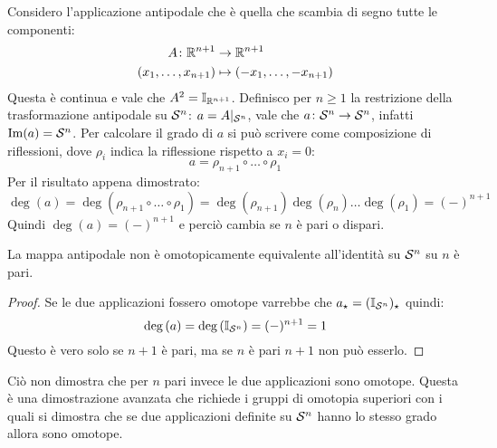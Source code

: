 Considero l'applicazione antipodale che è quella che scambia di segno tutte le componenti:
\begin{align*}
  A \colon \mathbb{R}^{{n+1}} & \to \mathbb{R}^{n+1} \\
  (x_1, \dots, x_{n+1}) & \mapsto (-x_1, \dots, -x_{n+1})
\end{align*}
Questa è continua e vale che $ A^2 = \mathbb{I}_{\mathbb{R}^{n+1}}$. Definisco per $ n \geq 1 $ la
restrizione della trasformazione antipodale su $ \mathcal{S}^{n} $:
$ a = A \lvert_{\mathcal{S}^{n}} $, vale che $ a \colon \mathcal{S}^{n} \to \mathcal{S}^{n} $, infatti
$ \mathrm{Im}( a ) = \mathcal{S}^{n} $. Per calcolare il grado di $ a $ si può scrivere come
composizione di riflessioni, dove $ \rho_i $ indica la riflessione rispetto a
$ x_i = 0 $:
\[
  a = \rho_{n+1} \circ \dots \circ \rho_1
\]
Per il risultato appena dimostrato:
\[
  \deg{(a)} = \deg{(\rho_{n+1} \circ \dots \circ \rho_1)} = \deg{(\rho_{n+1})}\deg{(\rho_n)}\dots\deg{(\rho_1)} = (-)^{n+1}
\]
Quindi $ \deg{(a)} = (-)^{n+1} $ e perciò cambia se $ n $ è pari o dispari.

\begin{corollary}
  La mappa antipodale non è omotopicamente equivalente all'identità su $ \mathcal{S}^{n} $ su $ n $ è pari.
\end{corollary}
\begin{proof}
  Se le due applicazioni fossero omotope varrebbe che $ a_\star = (\mathbb{I}_{\mathcal{S}^{n}})_\star $ quindi:
  \[
    \deg{(a)} = \deg{(\mathbb{I}_{\mathcal{S}^{n}})} = (-)^{n+1} = 1
  \]
  Questo è vero solo se $ n + 1 $ è pari, ma se $ n $ è pari $ n + 1 $ non può esserlo.
\end{proof}
\eproof
Ciò non dimostra che per $ n $ pari invece le due applicazioni sono omotope. Questa è una
dimostrazione avanzata che richiede i gruppi di omotopia superiori con i quali si dimostra
che se due applicazioni definite su $ \mathcal{S}^{n} $ hanno lo stesso grado allora sono omotope.

